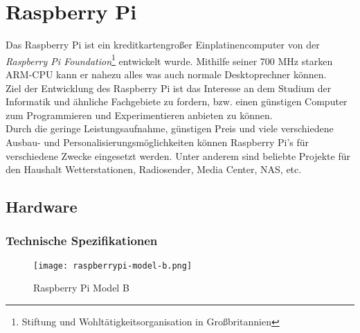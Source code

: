 \chapter{Raspberry Pi}

				
				
Das Raspberry Pi ist ein kreditkartengroßer Einplatinencomputer von der \textit{Raspberry Pi Foundation}\footnote{Stiftung und Wohltätigkeitsorganisation in Großbritannien} entwickelt wurde. Mithilfe seiner 700 MHz starken ARM-CPU kann er nahezu alles was auch normale Desktoprechner können.\\

Ziel der Entwicklung des Raspberry Pi ist das Interesse an dem Studium der Informatik und ähnliche Fachgebiete zu fordern, bzw. einen günstigen Computer zum Programmieren und Experimentieren anbieten zu können.\\

Durch die geringe Leistungsaufnahme, günstigen Preis und viele verschiedene Ausbau- und Personalisierungsmöglichkeiten können Raspberry Pi’s für verschiedene Zwecke eingesetzt werden. Unter anderem sind beliebte Projekte für den Haushalt Wetterstationen, Radiosender, Media Center, NAS, etc.

\newpage

\section{Hardware}
\subsection{Technische Spezifikationen}

\begin{figure}[h]
  \begin{center}		%
    \texttt{[image: raspberrypi-model-b.png]}
  		  \caption{Raspberry Pi Model B}
     \label{raspPic}
  \end{center}
\end{figure}

